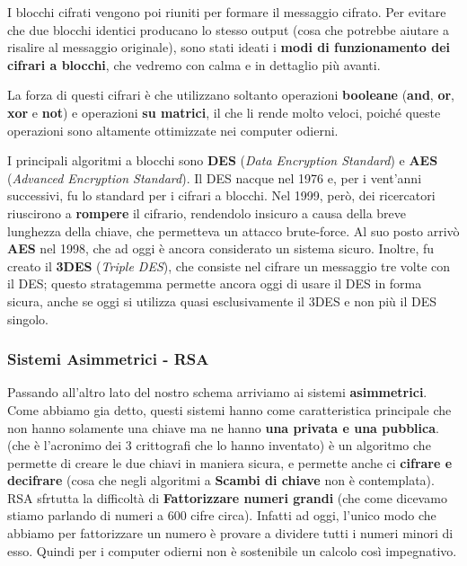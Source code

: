 \documentclass{report}
\begin{document}
I blocchi cifrati vengono poi riuniti per formare il messaggio cifrato. Per evitare che due blocchi identici producano lo stesso output (cosa che potrebbe aiutare a risalire al messaggio originale), sono stati ideati i \textbf{modi di funzionamento dei cifrari a blocchi}, che vedremo con calma e in dettaglio più avanti.

\newpage

La forza di questi cifrari è che utilizzano soltanto operazioni \textbf{booleane} (\textbf{and}, \textbf{or}, \textbf{xor} e \textbf{not}) e operazioni \textbf{su matrici}, il che li rende molto veloci, poiché queste operazioni sono altamente ottimizzate nei computer odierni.


I principali algoritmi a blocchi sono \textbf{DES} (\textit{Data Encryption Standard}) e \textbf{AES} (\textit{Advanced Encryption Standard}). Il DES nacque nel 1976 e, per i vent’anni successivi, fu lo standard per i cifrari a blocchi. Nel 1999, però, dei ricercatori riuscirono a \textbf{rompere} il cifrario, rendendolo insicuro a causa della breve lunghezza della chiave, che permetteva un attacco brute-force. Al suo posto arrivò \textbf{AES} nel 1998, che ad oggi è ancora considerato un sistema sicuro. Inoltre, fu creato il \textbf{3DES} (\textit{Triple DES}), che consiste nel cifrare un messaggio tre volte con il DES; questo stratagemma permette ancora oggi di usare il DES in forma sicura, anche se oggi si utilizza quasi esclusivamente il 3DES e non più il DES singolo.


\subsubsection{Sistemi Asimmetrici - RSA}

Passando all'altro lato del nostro schema arriviamo ai sistemi \textbf{asimmetrici}. Come abbiamo gia detto, questi sistemi hanno come caratteristica principale che non hanno solamente una chiave ma ne hanno \textbf{una privata e una pubblica}.  (che è l'acronimo dei 3 crittografi che lo hanno inventato) è un algoritmo che permette di creare le due chiavi in maniera sicura, e permette anche ci \textbf{cifrare e decifrare} (cosa che negli algoritmi a \textbf{Scambi di chiave} non è contemplata). RSA sfrtutta la difficoltà di \textbf{Fattorizzare numeri grandi} (che come dicevamo stiamo parlando di numeri a 600 cifre circa). Infatti ad oggi, l'unico modo che abbiamo per fattorizzare un numero è provare a dividere tutti i numeri minori di esso. Quindi per i computer odierni non è sostenibile un calcolo così impegnativo.  
\end{document}
